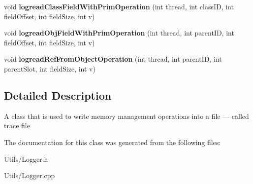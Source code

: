 \begin{DoxyCompactItemize}
\item 
\hypertarget{classtrace_gen_1_1_logger_aa6d19b0a494ef8fe2df89f2ebf7a85b1}{}void {\bfseries logread\+Class\+Field\+With\+Prim\+Operation} (int thread, int class\+I\+D, int field\+Offset, int field\+Size, int v)\label{classtrace_gen_1_1_logger_aa6d19b0a494ef8fe2df89f2ebf7a85b1}

\item 
\hypertarget{classtrace_gen_1_1_logger_a21cfc25c205d641dbaa383ec37cd1eaf}{}void {\bfseries logread\+Obj\+Field\+With\+Prim\+Operation} (int thread, int parent\+I\+D, int field\+Offset, int field\+Size, int v)\label{classtrace_gen_1_1_logger_a21cfc25c205d641dbaa383ec37cd1eaf}

\item 
\hypertarget{classtrace_gen_1_1_logger_a43b88e09c6364f71fea65fe3cf223878}{}void {\bfseries logread\+Ref\+From\+Object\+Operation} (int thread, int parent\+I\+D, int parent\+Slot, int field\+Size, int v)\label{classtrace_gen_1_1_logger_a43b88e09c6364f71fea65fe3cf223878}

\end{DoxyCompactItemize}


\subsection{Detailed Description}
A class that is used to write memory management operations into a file --- called trace file 

The documentation for this class was generated from the following files\+:\begin{DoxyCompactItemize}
\item 
Utils/Logger.\+h\item 
Utils/Logger.\+cpp\end{DoxyCompactItemize}
